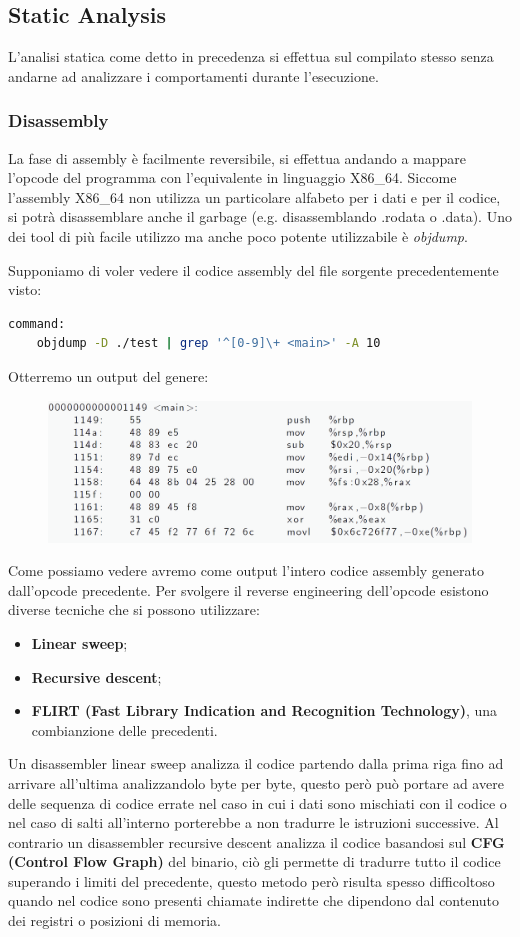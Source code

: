 \subsection{Static Analysis}
L'analisi statica come detto in precedenza si effettua sul compilato stesso senza andarne ad analizzare i comportamenti durante l'esecuzione.

\subsubsection{Disassembly}
La fase di assembly è facilmente reversibile, si effettua andando a mappare l'opcode del programma con l'equivalente in linguaggio X86\_64. Siccome l'assembly X86\_64 non utilizza un particolare alfabeto per i dati e per il codice, si potrà disassemblare anche il garbage (e.g. disassemblando .rodata o .data).
Uno dei tool di più facile utilizzo ma anche poco potente utilizzabile è \textit{objdump}.

Supponiamo di voler vedere il codice assembly del file sorgente precedentemente visto:
\begin{lstlisting}[language=bash]
    command:
    objdump -D ./test | grep '^[0-9]\+ <main>' -A 10
\end{lstlisting}

Otterremo un output del genere:
\begin{figure}[h!]
    \centering
    \includegraphics[width=.6\linewidth]{res/objdump_1.png}
    \caption{}
\end{figure}

Come possiamo vedere avremo come output l'intero codice assembly generato dall'opcode precedente.
Per svolgere il reverse engineering dell'opcode esistono diverse tecniche che si possono utilizzare:
\begin{itemize}
    \item \textbf{Linear sweep};
    \item \textbf{Recursive descent};
    \item \textbf{FLIRT (Fast Library Indication and Recognition Technology)}, una combianzione delle precedenti.
\end{itemize}

Un disassembler linear sweep analizza il codice partendo dalla prima riga fino ad arrivare all'ultima analizzandolo byte per byte, questo però può portare ad avere delle sequenza di codice errate nel caso in cui i dati sono mischiati con il codice o nel caso di salti all'interno porterebbe a non tradurre le istruzioni successive.
Al contrario un disassembler recursive descent analizza il codice basandosi sul \textbf{CFG (Control Flow Graph)} del binario, ciò gli permette di tradurre tutto il codice superando i limiti del precedente, questo metodo però risulta spesso difficoltoso quando nel codice sono presenti chiamate indirette che dipendono dal contenuto dei registri o posizioni di memoria.
\clearpage
